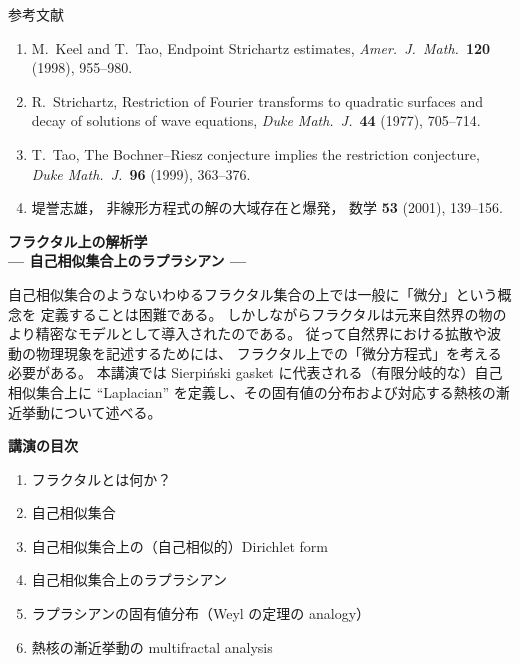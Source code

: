 \documentclass[uplatex,dvipdfmx]{jlreq}
\begin{document}
\vspace{5mm}

\begin{center}
  \textsc{参考文献}
\end{center}
\begin{enumerate}
  \item M.~Keel and T.~Tao,
        Endpoint Strichartz estimates,
        \textit{Amer.~J.~Math.}~\textbf{120} (1998), 955--980.
  \item R.~Strichartz,
        Restriction of Fourier transforms to quadratic surfaces
        and decay of solutions of wave equations,
        \textit{Duke Math.~J.}~\textbf{44} (1977), 705--714.
  \item T.~Tao,
        The Bochner--Riesz conjecture implies the restriction conjecture,
        \textit{Duke Math.~J.}~\textbf{96} (1999), 363--376.
  \item 堤誉志雄，
        非線形方程式の解の大域存在と爆発，
        数学 \textbf{53} (2001), 139--156.
\end{enumerate}

\newpage

\begin{center}
  {\large\bfseries フラクタル上の解析学\\
  \normalsize --- 自己相似集合上のラプラシアン ---}
\end{center}

\bigskip
\hspace*{\fill}{\large\bfseries 木上　淳（京都大学大学院情報学研究科）}

\bigskip

自己相似集合のようないわゆるフラクタル集合の上では一般に「微分」という概念を
定義することは困難である。
しかしながらフラクタルは元来自然界の物のより精密なモデルとして導入されたのである。
従って自然界における拡散や波動の物理現象を記述するためには、
フラクタル上での「微分方程式」を考える必要がある。
本講演では Sierpi\'{n}ski gasket に代表される（有限分岐的な）自己相似集合上に
``Laplacian'' を定義し、その固有値の分布および対応する熱核の漸近挙動について述べる。

\medskip
\noindent\textbf{講演の目次}
\begin{enumerate}
  \setlength{\itemsep}{2pt}
  \item フラクタルとは何か？
  \item 自己相似集合
  \item 自己相似集合上の（自己相似的）Dirichlet form
  \item 自己相似集合上のラプラシアン
  \item ラプラシアンの固有値分布（Weyl の定理の analogy）
  \item 熱核の漸近挙動の multifractal analysis
\end{enumerate}
\end{document}
